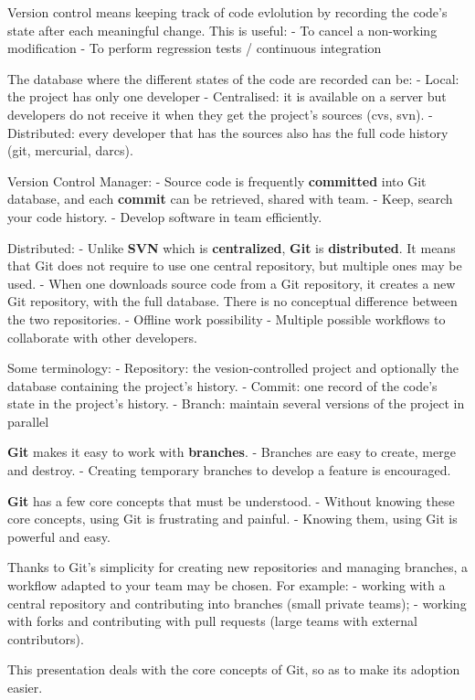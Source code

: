 \documentclass{article}
\begin{document}
    Version control means keeping track of code evlolution by recording the
code's state after each meaningful change. This is useful: - To cancel a
non-working modification - To perform regression tests / continuous
integration

The database where the different states of the code are recorded can be:
- Local: the project has only one developer - Centralised: it is
available on a server but developers do not receive it when they get the
project's sources (cvs, svn). - Distributed: every developer that has
the sources also has the full code history (git, mercurial, darcs).

Version Control Manager: - Source code is frequently \textbf{committed}
into Git database, and each \textbf{commit} can be retrieved, shared
with team. - Keep, search your code history. - Develop software in team
efficiently.

Distributed: - Unlike \textbf{SVN} which is \textbf{centralized},
\textbf{Git} is \textbf{distributed}. It means that Git does not require
to use one central repository, but multiple ones may be used. - When one
downloads source code from a Git repository, it creates a new Git
repository, with the full database. There is no conceptual difference
between the two repositories. - Offline work possibility - Multiple
possible workflows to collaborate with other developers.

Some terminology: - Repository: the vesion-controlled project and
optionally the database containing the project's history. - Commit: one
record of the code's state in the project's history. - Branch: maintain
several versions of the project in parallel

\textbf{Git} makes it easy to work with \textbf{branches}. - Branches
are easy to create, merge and destroy. - Creating temporary branches to
develop a feature is encouraged.

\textbf{Git} has a few core concepts that must be understood. - Without
knowing these core concepts, using Git is frustrating and painful. -
Knowing them, using Git is powerful and easy.

Thanks to Git's simplicity for creating new repositories and managing
branches, a workflow adapted to your team may be chosen. For example: -
working with a central repository and contributing into branches (small
private teams); - working with forks and contributing with pull requests
(large teams with external contributors).

This presentation deals with the core concepts of Git, so as to make its
adoption easier.
\end{document}
